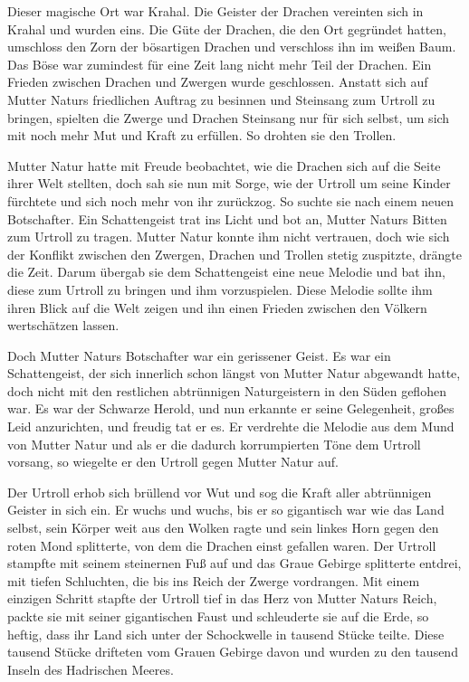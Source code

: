 Dieser magische Ort war Krahal. Die Geister der Drachen vereinten sich in Krahal und wurden eins. Die Güte der Drachen, die den Ort gegründet hatten, umschloss den Zorn der bösartigen Drachen und verschloss ihn im weißen Baum. Das Böse war zumindest für eine Zeit lang nicht mehr Teil der Drachen. Ein Frieden zwischen Drachen und Zwergen wurde geschlossen. Anstatt sich auf Mutter Naturs friedlichen Auftrag zu besinnen und Steinsang zum Urtroll zu bringen, spielten die Zwerge und Drachen Steinsang nur für sich selbst, um sich mit noch mehr Mut und Kraft zu erfüllen. So drohten sie den Trollen.

Mutter Natur hatte mit Freude beobachtet, wie die Drachen sich auf die Seite ihrer Welt stellten, doch sah sie nun mit Sorge, wie der Urtroll um seine Kinder fürchtete und sich noch mehr von ihr zurückzog. So suchte sie nach einem neuen Botschafter. Ein Schattengeist trat ins Licht und bot an, Mutter Naturs Bitten zum Urtroll zu tragen. Mutter Natur konnte ihm nicht vertrauen, doch wie sich der Konflikt zwischen den Zwergen, Drachen und Trollen stetig zuspitzte, drängte die Zeit. Darum übergab sie dem Schattengeist eine neue Melodie und bat ihn, diese zum Urtroll zu bringen und ihm vorzuspielen. Diese Melodie sollte ihm ihren Blick auf die Welt zeigen und ihn einen Frieden zwischen den Völkern wertschätzen lassen.

Doch Mutter Naturs Botschafter war ein gerissener Geist. Es war ein Schattengeist, der sich innerlich schon längst von Mutter Natur abgewandt hatte, doch nicht mit den restlichen abtrünnigen Naturgeistern in den Süden geflohen war. Es war der Schwarze Herold, und nun erkannte er seine Gelegenheit, großes Leid anzurichten, und freudig tat er es. Er verdrehte die Melodie aus dem Mund von Mutter Natur und als er die dadurch korrumpierten Töne dem Urtroll vorsang, so wiegelte er den Urtroll gegen Mutter Natur auf.

Der Urtroll erhob sich brüllend vor Wut und sog die Kraft aller abtrünnigen Geister in sich ein. Er wuchs und wuchs, bis er so gigantisch war wie das Land selbst, sein Körper weit aus den Wolken ragte und sein linkes Horn gegen den roten Mond splitterte, von dem die Drachen einst gefallen waren. Der Urtroll stampfte mit seinem steinernen Fuß auf und das Graue Gebirge splitterte entdrei, mit tiefen Schluchten, die bis ins Reich der Zwerge vordrangen. Mit einem einzigen Schritt stapfte der Urtroll tief in das Herz von Mutter Naturs Reich, packte sie mit seiner gigantischen Faust und schleuderte sie auf die Erde, so heftig, dass ihr Land sich unter der Schockwelle in tausend Stücke teilte. Diese tausend Stücke drifteten vom Grauen Gebirge davon und wurden zu den tausend Inseln des Hadrischen Meeres.


